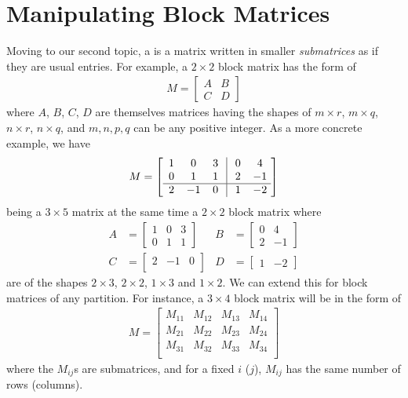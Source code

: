 \section{Manipulating Block Matrices}

Moving to our second topic, a  is a matrix written in smaller \textit{submatrices} as if they are usual entries. For example, a $2 \times 2$ block matrix has the form of
\begin{align*}
M =
\begin{bmatrix}
A & B \\
C & D
\end{bmatrix}
\end{align*}
where $A$, $B$, $C$, $D$ are themselves matrices having the shapes of $m \times r$, $m \times q$, $n \times r$, $n \times q$, and $m, n, p, q$ can be any positive integer. As a more concrete example, we have
\begin{align*}
M = 
\left[\begin{array}{@{\;}wc{10pt}wc{10pt}wc{10pt}|wc{10pt}wc{10pt}}
1 & 0 & 3 & 0 & 4 \\
0 & 1 & 1 & 2 & -1 \\
\hline
2 & -1 & 0 & 1 & -2 \\
\end{array}\right]
\end{align*}
being a $3 \times 5$ matrix at the same time a $2 \times 2$ block matrix where
\begin{align*}
A &= \begin{bmatrix}
1 & 0 & 3 \\
0 & 1 & 1
\end{bmatrix}
& 
B &= \begin{bmatrix}
0 & 4 \\
2 & -1
\end{bmatrix} \\
C &= \begin{bmatrix}
2 & -1 & 0 \\
\end{bmatrix}
& 
D &= \begin{bmatrix}
1 & -2
\end{bmatrix}
\end{align*}
are of the shapes $2 \times 3$, $2 \times 2$, $1 \times 3$ and $1 \times 2$. We can extend this for block matrices of any partition. For instance, a $3 \times 4$ block matrix will be in the form of
\begin{align*}
M =
\begin{bmatrix}
M_{11} & M_{12} & M_{13} & M_{14} \\
M_{21} & M_{22} & M_{23} & M_{24} \\
M_{31} & M_{32} & M_{33} & M_{34} \\
\end{bmatrix}
\end{align*}
where the $M_{ij}$s are submatrices, and for a fixed $i$ ($j$), $M_{ij}$ has the same number of rows (columns).

